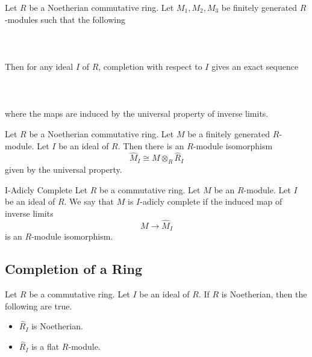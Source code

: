 \documentclass[a4paper]{article}
\begin{document}
\begin{prp}{}{} Let $R$ be a Noetherian commutative ring. Let $M_1,M_2,M_3$ be finitely generated $R$-modules such that the following \\~\\
 \\~\\
Then for any ideal $I$ of $R$, completion with respect to $I$ gives an exact sequence \\~\\
 \\~\\
where the maps are induced by the universal property of inverse limits. 
\end{prp}

\begin{prp}{}{} Let $R$ be a Noetherian commutative ring. Let $M$ be a finitely generated $R$-module. Let $I$ be an ideal of $R$. Then there is an $R$-module isomorphism $$\widehat{M}_I\cong M\otimes_R\widehat{R}_I$$ given by the universal property. 
\end{prp}

\begin{defn}{I-Adicly Complete}{} Let $R$ be a commutative ring. Let $M$ be an $R$-module. Let $I$ be an ideal of $R$. We say that $M$ is $I$-adicly complete if the induced map of inverse limits $$M\to\widehat{M}_I$$ is an $R$-module isomorphism. 
\end{defn}

\subsection{Completion of a Ring}
\begin{prp}{}{} Let $R$ be a commutative ring. Let $I$ be an ideal of $R$. If $R$ is Noetherian, then the following are true. 
\begin{itemize}
\item $\widehat{R}_I$ is Noetherian. 
\item $\widehat{R}_I$ is a flat $R$-module. 
\end{itemize}
\end{prp}
\end{document}
